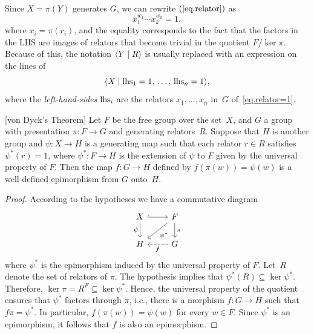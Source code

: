 \begin{defns}
    Since $X=\pi(Y)$ generates $G$, we can rewrite $(\ref{eq.relator})$ as
    \begin{equation}\label{eq.relator=1}
        x_1^{w_1}\cdots x_k^{w_k}=1,
    \end{equation}
    where $x_i=\pi(r_i)$, and the equality corresponds to the fact that the factors in the LHS are images of relators that become trivial in the quotient $F/\ker\pi$. Because of this, the notation $\langle Y\mid R\rangle$ is usually replaced with an expression on the lines of
    $$
        \langle X\mid \operatorname{lhs}_1=1,\,\dots,\,\operatorname{lhs}_n=1\rangle,
    $$
    where the \textit{left-hand-sides\/} $\operatorname{lhs}_i$ are the relators $x_1,\dots,x_n$ in~$G$ of~\eqref{eq.relator=1}.
\end{defns}


\begin{thm}\label{von-dyck-thm} \textrm{\rm[von Dyck's Theorem]}
    Let $F$ be the free group over the set\/~$X$, and\/ $G$ a group with presentation\/ $\pi\colon F \to G$ and generating relators\/~$R$. Suppose that\/ $H$ is another group and\/ $\psi: X \to H$ is a generating map such that each relator\/ $r\in R$ satisfies\/ $\psi^*(r)=1$, where\/ $\psi^*\colon F\to H$ is the extension of\/ $\psi$ to $F$ given by the universal property of\/ $F$. Then the map\/ $f\colon G \to H$ defined by\/ $f(\pi(w)) = \psi(w)$ is a well-defined epimorphism from\/ $G$ onto~$H$.
\end{thm}

\begin{proof}
    According to the hypotheses we have a commutative diagram
    $$
        \begin{tikzcd}
            X
                    \arrow[r,hook]
                    \arrow[d,"\psi"']
                &F
                    \arrow[d,"\pi"]
                    \arrow[ld,"\psi^*"]\\
            H
                &G
                    \arrow[l,"f",dashed]
        \end{tikzcd}
    $$
    where $\psi^*$ is the epimorphism induced by the universal property of $F$.
    Let~$R$ denote the set of relators of $\pi$. The hypothesis implies that $\psi^*(R)\subseteq\ker\psi^*$. Therefore, $\ker\pi=R^F\subseteq\ker\psi^*$. Hence, the universal property of the quotient ensures that $\psi^*$ factors through $\pi$, i.e., there is a morphism $f\colon G\to H$ such that $f\pi=\psi^*$. In particular, $f(\pi(w))=\psi(w)$ for every $w\in F$. Since $\psi^*$ is an epimorphism, it follows that $f$ is also an epimorphism.
\end{proof}

